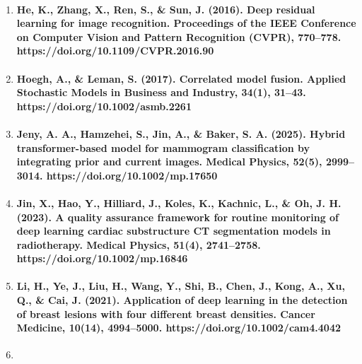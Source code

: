\begin{enumerate}
  \paragraph{Hadjiiski, L., Cha, K., Chan, H., Drukker, K., Morra, L., Nappi, J., Sahiner, B., Yoshida, H., Zhang, R., \& Zheng, B. (2022). AAPM task group report 273: Recommendations on best practices for AI and machine learning for computer-aided diagnosis in medical imaging. Medical Physics, 50(2), e1–e24. https://doi.org/10.1002/mp.16188}
\item
  \paragraph{He, K., Zhang, X., Ren, S., \& Sun, J. (2016). Deep residual learning for image recognition. Proceedings of the IEEE Conference on Computer Vision and Pattern Recognition (CVPR), 770–778. https://doi.org/10.1109/CVPR.2016.90}
\item
  \paragraph{Hoegh, A., \& Leman, S. (2017). Correlated model fusion. Applied Stochastic Models in Business and Industry, 34(1), 31–43. https://doi.org/10.1002/asmb.2261}
\item
  \paragraph{Jeny, A. A., Hamzehei, S., Jin, A., \& Baker, S. A. (2025). Hybrid transformer-based model for mammogram classification by integrating prior and current images. Medical Physics, 52(5), 2999–3014. https://doi.org/10.1002/mp.17650}
\item
  \paragraph{Jin, X., Hao, Y., Hilliard, J., Koles, K., Kachnic, L., \& Oh, J. H. (2023). A quality assurance framework for routine monitoring of deep learning cardiac substructure CT segmentation models in radiotherapy. Medical Physics, 51(4), 2741–2758. https://doi.org/10.1002/mp.16846}
\item
  \paragraph{Li, H., Ye, J., Liu, H., Wang, Y., Shi, B., Chen, J., Kong, A., Xu, Q., \& Cai, J. (2021). Application of deep learning in the detection of breast lesions with four different breast densities. Cancer Medicine, 10(14), 4994–5000. https://doi.org/10.1002/cam4.4042}
\item

\end{enumerate}

